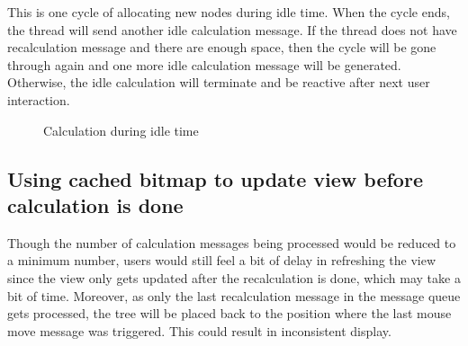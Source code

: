 \documentclass[MSc]{icldt}
\begin{document}
This is one cycle of allocating new nodes during idle time. When the cycle ends, the thread will send another idle calculation message. If the thread does not have recalculation message and there are enough space, then the cycle will be gone through again and one more idle calculation message will be generated. Otherwise, the idle calculation will terminate and be reactive after next user interaction.

 \begin{figure}[H]
\caption{Calculation during idle time}
 \end{figure}


\subsection{Using cached bitmap to update view before calculation is done}
 
 Though the number of calculation messages being processed would be reduced to a minimum number, users would still feel a bit of delay in refreshing the view since the view only gets updated after the recalculation is done, which may take a bit of time. Moreover, as only the last recalculation message in the message queue gets processed, the tree will be placed back to the position where the last mouse move message was triggered. This could result in inconsistent display. 
 
\end{document}

